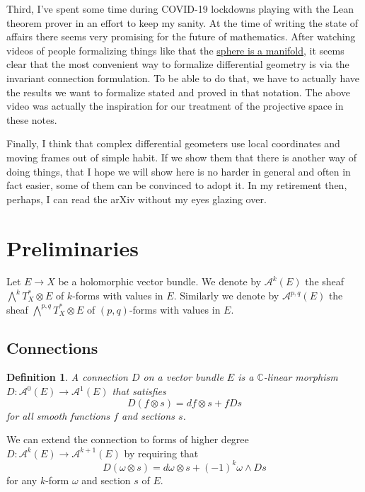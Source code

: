 \documentclass[11pt]{article}
\newtheorem{defi}[theo]{Definition}
\newcommand{\kk}[1]{\mathbb{#1}}
\newcommand{\cc}[1]{\mathcal{#1}}
\begin{document}
Third, I've spent some time during COVID-19 lockdowns playing with the Lean theorem prover in an effort to keep my sanity. At the time of writing the state of affairs there seems very promising for the future of mathematics. After watching videos of people formalizing things like that the \hyperlink{https://www.youtube.com/watch?v=deppJ2q_5a0}{sphere is a manifold}, it seems clear that the most convenient way to formalize differential geometry is via the invariant connection formulation. To be able to do that, we have to actually have the results we want to formalize stated and proved in that notation. The above video was actually the inspiration for our treatment of the projective space in these notes.

Finally, I think that complex differential geometers use local coordinates and moving frames out of simple habit. If we show them that there is another way of doing things, that I hope we will show here is no harder in general and often in fact easier, some of them can be convinced to adopt it. In my retirement then, perhaps, I can read the arXiv without my eyes glazing over.


\tableofcontents


\section{Preliminaries}
\label{sec:org093d592}

Let $E \to X$ be a holomorphic vector bundle. We denote by $\cc A^k(E)$ the sheaf $\bigwedge^k T_X^* \otimes E$ of $k$-forms with values in $E$. Similarly we denote by $\cc A^{p,q}(E)$ the sheaf $\bigwedge^{p,q} T_X^* \otimes E$ of $(p,q)$-forms with values in $E$.


\subsection{Connections}

\begin{defi}
A \emph{connection} $D$ on a vector bundle $E$ is a $\kk C$-linear morphism $D : \cc A^0(E) \to \cc A^1(E)$ that satisfies
$$
D(f \otimes s) = df \otimes s + f Ds
$$
for all smooth functions $f$ and sections $s$.
\end{defi}

We can extend the connection to forms of higher degree $D : \cc A^k(E) \to \cc A^{k+1}(E)$ by requiring that
$$
D(\omega \otimes s) = d \omega \otimes s + (-1)^{k} \omega \wedge D s
$$
for any $k$-form $\omega$ and section $s$ of $E$.
\end{document}
